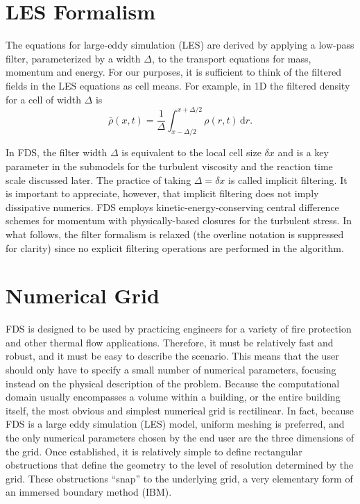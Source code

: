 \section{LES Formalism}
\label{filteredfields}

The equations for large-eddy simulation (LES) are derived by applying a low-pass filter, parameterized by a width $\Delta$, to the transport equations for mass, momentum and energy.  For our purposes, it is sufficient to think of the filtered fields in the LES equations as cell means.  For example, in 1D the filtered density for a cell of width $\Delta$ is
\begin{equation}
\label{eqn_filtered_density}
\bar{\rho}(x,t) = \frac{1}{\Delta}\int_{x-\Delta/2}^{x+\Delta/2} \rho(r,t) \,\mbox{d}r \mbox{.}
\end{equation}

In FDS, the filter width $\Delta$ is equivalent to the local cell size $\delta x$ and is a key parameter in the submodels for the turbulent viscosity and the reaction time scale discussed later.  The practice of taking $\Delta = \delta x$ is called implicit filtering.  It is important to appreciate, however, that implicit filtering does not imply dissipative numerics.  FDS employs kinetic-energy-conserving central difference schemes for momentum with physically-based closures for the turbulent stress.  In what follows, the filter formalism is relaxed (the overline notation is suppressed for clarity) since no explicit filtering operations are performed in the algorithm.

\section{Numerical Grid}
\label{govequations}

FDS is designed to be used by practicing engineers for a variety of fire protection and other thermal flow applications.
Therefore, it must be relatively fast and robust, and it must be easy to describe the scenario. This means that the user
should only have to specify a small number of numerical parameters, focusing instead on the physical description of the
problem. Because the
computational domain usually encompasses a volume within a building, or the entire building itself, the
most obvious and simplest numerical grid is rectilinear.
In fact, because FDS is a large eddy simulation (LES) model, uniform meshing is
preferred, and the only numerical parameters chosen by the end user are the three dimensions of the grid. Once established, it
is relatively simple to define rectangular obstructions that define the geometry to the level of resolution determined by the
grid. These obstructions ``snap'' to the underlying grid, a very elementary form of an immersed boundary method (IBM).

